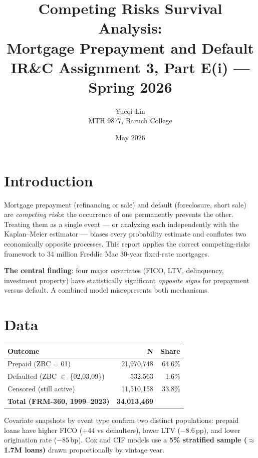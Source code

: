 \documentclass[11pt,a4paper]{article}
\title{\vspace{-1.5em}\textbf{Competing Risks Survival Analysis:\\
Mortgage Prepayment and Default}\\[0.3em]
\large IR\&C Assignment 3, Part E(i) --- Spring 2026}
\author{Yueqi Lin\\\small MTH 9877, Baruch College}
\date{May 2026}
\begin{document}
\maketitle
\vspace{-1.2em}

\section{Introduction}

Mortgage prepayment (refinancing or sale) and default (foreclosure, short sale) are
\emph{competing risks}: the occurrence of one permanently prevents the other.
Treating them as a single event --- or analyzing each independently with the
Kaplan--Meier estimator --- biases every probability estimate and conflates two
economically opposite processes. This report applies the correct competing-risks
framework to 34 million Freddie Mac 30-year fixed-rate mortgages.

\textbf{The central finding}: four major covariates (FICO, LTV, delinquency, investment
property) have statistically significant \emph{opposite signs} for prepayment versus
default. A combined model misrepresents both mechanisms.

\section{Data}

\begin{center}
\small
\begin{tabular}{lrr}
\toprule
\textbf{Outcome} & \textbf{N} & \textbf{Share} \\
\midrule
Prepaid (ZBC = 01)        & 21{,}970{,}748 & 64.6\% \\
Defaulted (ZBC $\in$ \{02,03,09\}) & 532{,}563 & 1.6\% \\
Censored (still active)   & 11{,}510{,}158 & 33.8\% \\
\midrule
\textbf{Total (FRM-360, 1999--2023)} & \textbf{34{,}013{,}469} & \\
\bottomrule
\end{tabular}
\end{center}

Covariate snapshots by event type confirm two distinct populations:
prepaid loans have higher FICO ($+44$ vs defaulters), lower LTV ($-8.6$\,pp),
and lower origination rate ($-85$\,bp). Cox and CIF models use a
\textbf{5\% stratified sample ($\approx$1.7M loans)} drawn proportionally by vintage year.
\end{document}

